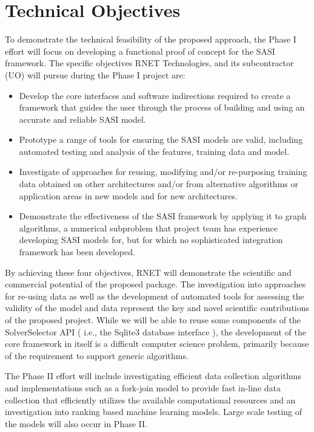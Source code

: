 \section{Technical Objectives}
 
To demonstrate the technical feasibility of the proposed approach, the Phase I effort will focus on developing a functional proof of concept for the 
SASI framework. The specific objectives RNET Technologies, and its subcontractor (UO) will pursue during the Phase I project are:

\begin{itemize}
  \item Develop the core interfaces and software indirections required to create a framework that 
  guides the user through the process of building and using an accurate and reliable SASI model.
  \item Prototype a range of tools for ensuring the SASI models are valid, including automated testing and analysis of the features, training data and model. 
  \item Investigate of approaches for reusing, modifying and/or re-purposing training data obtained on other architectures and/or from alternative algorithms or application areas in new models and for new architectures. 
  \item Demonstrate the effectiveness of the SASI framework by applying it to graph algorithms, a numerical subproblem that
  project team has experience developing SASI models for, but for which no sophisticated integration framework has been developed. 
\end{itemize}

By achieving these four objectives, RNET will demonstrate the scientific and commercial potential of the proposed package. The investigation into approaches for re-using data as well as the development of automated tools for assessing the validity of the model and data represent the key and novel scientific contributions of the proposed project. While we will be able to reuse some components of the SolverSelector API ( i.e., the Sqlite3 database interface ), the development of the core framework  in itself is a difficult computer science problem, primarily because of the requirement to support generic algorithms. 

The Phase II effort will include investigating efficient data collection algorithms and implementations such as a fork-join model to provide fast in-line data collection that efficiently utilizes the available computational resources and an investigation into ranking based machine learning models. Large scale testing of the models will also occur in Phase II. 
